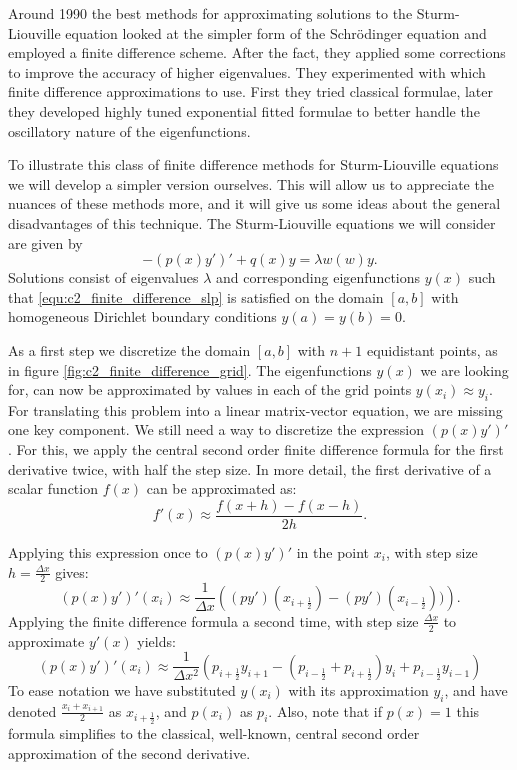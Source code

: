 Around 1990 the best methods \cite{andrew_correction_1985,vandenberghe_accurate_1991} for approximating solutions to the Sturm-Liouville equation looked at the simpler form of the Schrödinger equation and employed a finite difference scheme. After the fact, they applied some corrections to improve the accuracy of higher eigenvalues. They experimented with which finite difference approximations to use. First they tried classical formulae, later they developed highly tuned exponential fitted formulae to better handle the oscillatory nature of the eigenfunctions.

To illustrate this class of finite difference methods for Sturm-Liouville equations we will develop a simpler version ourselves. This will allow us to appreciate the nuances of these methods more, and it will give us some ideas about the general disadvantages of this technique. The Sturm-Liouville equations we will consider are given by
\begin{equation}\label{equ:c2_finite_difference_slp}
    -(p(x)y')' + q(x) y = \lambda w(w) y\text{.}
\end{equation}
Solutions consist of eigenvalues $\lambda$ and corresponding eigenfunctions $y(x)$ such that \eqref{equ:c2_finite_difference_slp} is satisfied on the domain $[a, b]$ with homogeneous Dirichlet boundary conditions $y(a) = y(b) = 0$.

As a first step we discretize the domain $[a, b]$ with $n+1$ equidistant points, as in figure \ref{fig:c2_finite_difference_grid}. The eigenfunctions $y(x)$ we are looking for, can now be approximated by values in each of the grid points $y(x_i) \approx y_i$. For translating this problem into a linear matrix-vector equation, we are missing one key component. We still need a way to discretize the expression $(p(x) y')'$. For this, we apply the central second order finite difference formula for the first derivative twice, with half the step size. In more detail, the first derivative of a scalar function $f(x)$ can be approximated as:
$$
    f'(x) \approx \frac{f(x + h) - f(x - h)}{2h}\text{.}
$$

Applying this expression once to $(p(x) y')'$ in the point $x_i$, with step size $h = \frac{\Delta x}{2}$ gives:
$$
    (p(x) y')'(x_i) \approx \frac{1}{\Delta x}\left((p y')\left(x_{i+\frac{1}{2}}\right) - (p y')\left(x_{i-\frac{1}{2}}\right))\right)\text{.}
$$
Applying the finite difference formula a second time, with step size $\frac{\Delta x}{2}$ to approximate $y'(x)$ yields:
$$
    (p(x) y')'(x_i) \approx \frac{1}{\Delta x^2}\left(p_{i+\frac{1}{2}} y_{i+1} - \left(p_{i-\frac{1}{2}} + p_{i+\frac{1}{2}}\right) y_i + p_{i-\frac{1}{2}} y_{i-1}\right)
$$
To ease notation we have substituted $y(x_i)$ with its approximation $y_i$, and have denoted $\frac{x_i + x_{i+1}}{2}$ as $x_{i+\frac{1}{2}}$, and $p(x_i)$ as $p_i$. Also, note that if $p(x) = 1$ this formula simplifies to the classical, well-known, central second order approximation of the second derivative.

